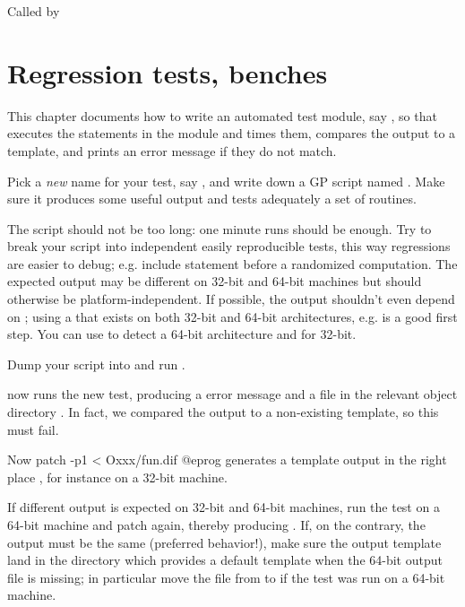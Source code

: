 {\item Called by 


\newpage

\chapter{Regression tests, benches}

This chapter documents how to write an automated test module, say ,
so that  executes the statements in the  module
and times them, compares the output to a template, and prints an error
message if they do not match.

\item Pick a \emph{new} name for your test, say , and write down a
GP script named . Make sure it produces some useful output and tests
adequately a set of routines.

\item The script should not be too long: one minute runs should be enough.
Try to break your script into independent easily reproducible tests, this way
regressions are easier to debug; e.g. include  statement before
a randomized computation. The expected output may be different on 32-bit and
64-bit machines but should otherwise be platform-independent. If possible, the
output shouldn't even depend on ; using a 
that exists on both 32-bit and 64-bit architectures, e.g.  is a
good first step. You can use  to detect a 64-bit
architecture and  for 32-bit.

\item Dump your script into  and run .

\item {} now runs the new test, producing a \kbd{[BUG]} error
message and a  file in the relevant object directory .
In fact, we compared the output to a non-existing template, so this must fail.

\item Now
\bprog
  patch -p1 < Oxxx/fun.dif
@eprog\noindent
generates a template output in the right place , for
instance on a 32-bit machine.

\item If different output is expected on 32-bit and 64-bit machines, run the
test on a 64-bit machine and patch again, thereby
producing . If, on the contrary, the output must be the
same (preferred behavior!), make sure the output template land in the
 directory which provides a default template when the
64-bit output file is missing; in particular move the file from
 to  if the test was run on a 64-bit
machine.

}
